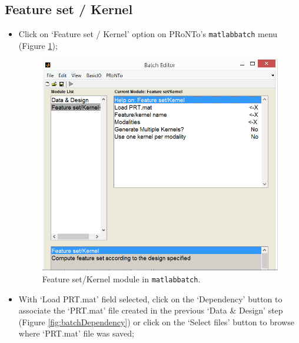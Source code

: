 \subsection{Feature set / Kernel}

\begin{itemize}
	\item Click on `Feature set / Kernel' option on PRoNTo's {\tt matlabbatch} menu (Figure \ref{fig:batchFeature});
	
	\begin{figure}[h!]
	\centering
		\includegraphics[scale=0.6]{images/Tutorial/classification/batchFeature.png}
	\caption{Feature set/Kernel module in {\tt matlabbatch}. }
	\label{fig:batchFeature}
\end{figure}
	
	\item With `Load PRT.mat' field selected, click on the `Dependency' button to associate the `PRT.mat' file created in the previous `Data \& Design' step (Figure \ref{fig:batchDependency}) or click on the `Select files' button to browse where `PRT.mat' file was saved;
	

\end{itemize}
